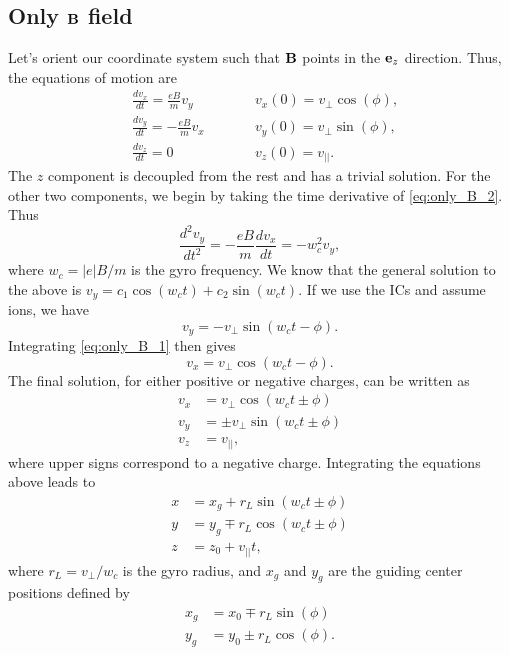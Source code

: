 \documentclass[oneside,a4paper,11pt]{report}
\begin{document}
\subsection{Only $\mathbf{B}$ field}
\label{sec:only_B_field}
Let's orient our coordinate system such that $\mathbf{B}$ points in the $\mathbf{e}_z$ direction. Thus, the equations of motion are
\begin{subequations}
\begin{alignat}{2}
    &\frac{d v_x}{dt} = \frac{eB}{m} v_y  \qquad && v_x(0) = v_\perp \cos(\phi), \label{eq:only_B_1} \\
    &\frac{d v_y}{dt} = -\frac{eB}{m} v_x  \qquad && v_y(0) = v_\perp \sin(\phi), \label{eq:only_B_2} \\
    &\frac{d v_z}{dt} = 0  \qquad && v_z(0) = v_{||}. \label{eq:only_B_3}
\end{alignat}
\end{subequations}
The $z$ component is decoupled from the rest and has a trivial solution. For the other two components, we begin by taking the time derivative of \cref{eq:only_B_2}. Thus
\begin{equation}
    \frac{d^2 v_y}{dt^2} = -\frac{eB}{m} \frac{d v_x}{dt} = -w_c^2 v_y,
\end{equation}
where $w_c = |e|B/m$ is the gyro frequency. We know that the general solution to the above is $v_y = c_1 \cos(w_c t) + c_2 \sin(w_c t)$. If we use the ICs and assume ions, we have
\begin{equation}
\label{eq:vel_gyro_y}
    v_y = -v_\perp \sin(w_ct - \phi).
\end{equation}
Integrating \cref{eq:only_B_1} then gives
\begin{equation}
\label{eq:vel_gyro_x}
    v_x = v_\perp \cos(w_c t - \phi).
\end{equation}
The final solution, for either positive or negative charges, can be written as
\begin{align}
\label{eq:vel_gyro}
    v_x &= v_\perp \cos(w_c t \pm \phi) \nonumber \\
    v_y &= \pm v_\perp \sin(w_c t \pm \phi) \nonumber \\
    v_z &= v_{||},
\end{align}
where upper signs correspond to a negative charge. Integrating the equations above leads to
\begin{align}
\label{eq:pos_gyro}
    x &= x_g + r_L \sin(w_c t \pm \phi) \nonumber \\
    y &= y_g \mp r_L \cos(w_c t \pm \phi) \nonumber \\
    z &= z_0 + v_{||}t,
\end{align}
where $r_L = v_\perp/w_c$ is the gyro radius, and $x_g$ and $y_g$ are the guiding center positions defined by
\begin{align}
    x_g &= x_0 \mp r_L \sin(\phi) \nonumber \\
    y_g &= y_0 \pm r_L \cos(\phi).
\end{align}
\end{document}
